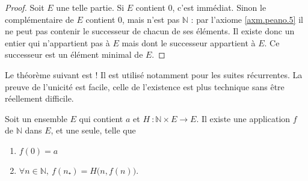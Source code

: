 %
\begin{proof}
Soit \(𝐸\) une telle partie. Si \(𝐸\) contient \(0\), c'est immédiat. Sinon le complémentaire de \(𝐸\) contient \(0\), mais
n'est pas \(ℕ\) : par l'axiome \ref{axm.peano.5} il ne peut pas contenir le successeur de chacun de ses
éléments. Il existe donc un entier qui n'appartient pas à \(𝐸\) mais dont le successeur appartient à \(𝐸\). Ce
successeur est un élément minimal de \(𝐸\).
\end{proof}
%
\begin{attention}
Le théorème suivant est ! Il est utilisé notamment pour les suites récurrentes.
La preuve de l'unicité est facile, celle de l'existence est plus technique sans être réellement difficile.
\end{attention}
%
\begin{theorem}
Soit un ensemble \(𝐸\) qui contient \(𝑎\) et \(𝐻~:ℕ×𝐸→𝐸\). Il existe une application \(𝑓\) de \(ℕ\) dans \(𝐸\), et
une seule, telle que
%
\begin{enumerate}
\item %
\(
𝑓(0)=𝑎
\)
\item \(∀𝑛∈ℕ,\ 𝑓(𝑛₊)=𝐻\bigl(𝑛,𝑓(𝑛)\bigr)\).
\end{enumerate}
\end{theorem}
%
